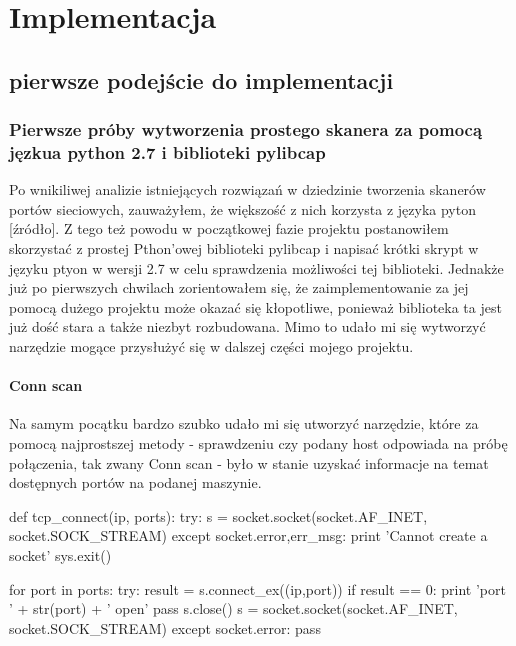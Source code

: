\chapter{Implementacja}


\section{pierwsze podejście do implementacji}

\subsection{Pierwsze próby wytworzenia prostego skanera za pomocą jęzkua python 2.7 i biblioteki pylibcap}

Po wnikiliwej analizie istniejących rozwiązań w dziedzinie tworzenia skanerów portów sieciowych, zauważyłem, że większość z nich korzysta z języka pyton [źródło]. Z tego też powodu w początkowej fazie projektu postanowiłem skorzystać z prostej Pthon'owej biblioteki pylibcap i napisać krótki skrypt w języku ptyon w wersji 2.7 w celu sprawdzenia możliwości tej biblioteki. Jednakże już po pierwszych chwilach zorientowałem się, że zaimplementowanie za jej pomocą dużego projektu może okazać się kłopotliwe, ponieważ biblioteka ta jest już dość stara a także niezbyt rozbudowana. Mimo to udało mi się wytworzyć narzędzie mogące przysłużyć się w dalszej części mojego projektu.

\subsubsection{Conn scan}
Na samym pocątku bardzo szubko udało mi się utworzyć narzędzie, które za pomocą najprostszej metody - sprawdzeniu czy podany host odpowiada na próbę połączenia, tak zwany Conn scan - było w stanie uzyskać informacje na temat dostępnych portów na podanej maszynie. 


\begin{python}
def tcp_connect(ip, ports):
    try:
        s = socket.socket(socket.AF_INET, socket.SOCK_STREAM)
    except socket.error,err_msg:
      print 'Cannot create a socket'
      sys.exit()

    for port in ports:
        try:
            result = s.connect_ex((ip,port))
            if result == 0:
                print 'port ' + str(port) + ' open'
                pass
            s.close()
            s = socket.socket(socket.AF_INET, socket.SOCK_STREAM)
        except socket.error:
            pass
\end{python}

